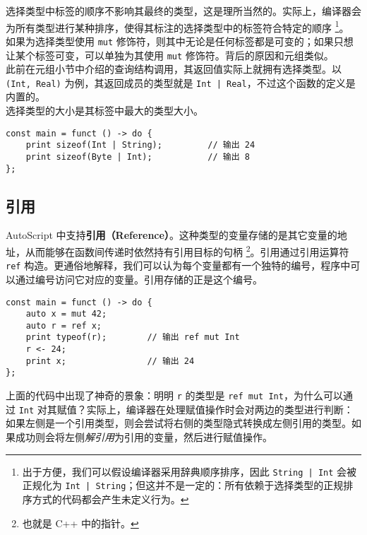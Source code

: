 选择类型中标签的顺序不影响其最终的类型，这是理所当然的。实际上，编译器会为所有类型进行某种排序，使得其标注的选择类型中的标签符合特定的顺序 \footnote{出于方便，我们可以假设编译器采用辞典顺序排序，因此 \lstinline!String | Int! 会被正规化为 \lstinline!Int | String!；但这并不是一定的：所有依赖于选择类型的正规排序方式的代码都会产生未定义行为。}。 \\

如果为选择类型使用 \lstinline!mut! 修饰符，则其中无论是任何标签都是可变的；如果只想让某个标签可变，可以单独为其使用 \lstinline!mut! 修饰符。背后的原因和元组类似。 \\

此前在元组小节中介绍的查询结构调用，其返回值实际上就拥有选择类型。以 \lstinline!(Int, Real)! 为例，其返回成员的类型就是 \lstinline!Int | Real!，不过这个函数的定义是内置的。 \\

选择类型的大小是其标签中最大的类型大小。

\begin{lstlisting}
const main = funct () -> do {
    print sizeof(Int | String);			// 输出 24
    print sizeof(Byte | Int);           // 输出 8
};
\end{lstlisting}


\subsection{引用}

AutoScript 中支持\textbf{引用（Reference）}。这种类型的变量存储的是其它变量的地址，从而能够在函数间传递时依然持有引用目标的句柄 \footnote{也就是 C++ 中的指针。}。引用通过引用运算符 \lstinline!ref! 构造。更通俗地解释，我们可以认为每个变量都有一个独特的编号，程序中可以通过编号访问它对应的变量。引用存储的正是这个编号。

\begin{lstlisting}
const main = funct () -> do {
    auto x = mut 42;
    auto r = ref x;
    print typeof(r);        // 输出 ref mut Int
    r <- 24;
    print x;                // 输出 24
};
\end{lstlisting}

上面的代码中出现了神奇的景象：明明 \lstinline!r! 的类型是 \lstinline!ref mut Int!，为什么可以通过 \lstinline!Int! 对其赋值？实际上，编译器在处理赋值操作时会对两边的类型进行判断：如果左侧是一个引用类型，则会尝试将右侧的类型隐式转换成左侧引用的类型。如果成功则会将左侧\emph{解引用}为引用的变量，然后进行赋值操作。 \\

